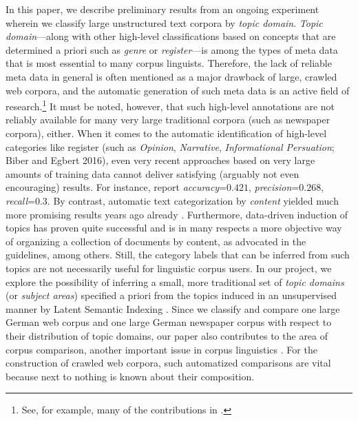 \documentclass[11pt]{article}
\begin{document}
In this paper, we describe preliminary results from an ongoing experiment wherein we classify large unstructured text corpora by \textit{topic domain}.
\textit{Topic domain}---along with other high-level classifications based on concepts that are determined a priori such as \textit{genre} or \textit{register}---is among the types of meta data that is most essential to many corpus linguists.
Therefore, the lack of reliable meta data in general is often mentioned as a major drawback of large, crawled web corpora, and the automatic generation of such meta data is an active field of research.\footnote{See, for example, many of the contributions in .}
It must be noted, however, that such high-level annotations are not reliably available for many very large traditional corpora (such as newspaper corpora), either.
When it comes to the automatic identification of high-level categories like register (such as \textit{Opinion}, \textit{Narrative}, \textit{Informational Persuation}; Biber and Egbert 2016), even very recent approaches based on very large amounts of training data cannot deliver satisfying (arguably not even encouraging) results.
For instance,  report \textit{accuracy}=$0.421$, \textit{precision}=$0.268$, \textit{recall}=$0.3$.
By contrast, automatic text categorization by \textit{content} yielded much more promising results years ago already \cite{Sebastiani2002}.
Furthermore, data-driven induction of topics has proven quite successful and is in many respects a more objective way of organizing a collection of documents by content, as advocated in the  guidelines, among others.
Still, the category labels that can be inferred from such topics are not necessarily useful for linguistic corpus users.
In our project, we explore the possibility of inferring a small, more traditional set of \textit{topic domains} (or \textit{subject areas}) specified a priori from the topics induced in an unsupervised manner by Latent Semantic Indexing \cite{LandauerDumais1994,LandauerDumais1997}.
Since we classify and compare one large German web corpus and one large German newspaper corpus with respect to their distribution of topic domains, our paper also contributes to the area of corpus comparison, another important issue in corpus linguistics \cite{Kilgarriff2001,BiemannEa2013}.
For the construction of crawled web corpora, such automatized comparisons are vital because next to nothing is known about their composition.
\end{document}
